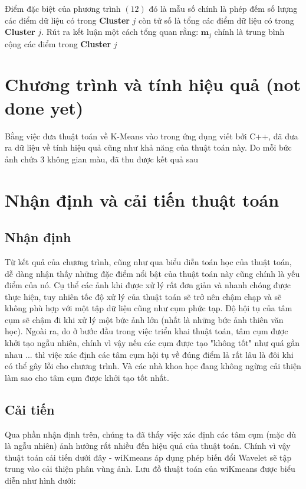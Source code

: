 \documentclass[12pt,a4paper]{article}
\begin{document}
Điểm đặc biệt của phương trình $(12)$ đó là mẫu số chính là phép đếm số lượng các điểm dữ liệu có trong \textbf{Cluster} $j$ còn tử số là tổng các điểm dữ liệu có trong \textbf{Cluster} $j$. Rút ra kết luận một cách tổng quan rằng: $\mathbf{m}_j$ chính là trung bình cộng các điểm trong \textbf{Cluster} $j$

\section{Chương trình và tính hiệu quả (not done yet)}
Bằng việc đưa thuật toán về K-Means vào trong ứng dụng viết bởi C++, đã đưa ra dữ liệu về tính hiệu quả cũng như khả năng của thuật toán này. Do mỗi bức ảnh chứa 3 không gian màu, đã thu được kết quả sau 

\section{Nhận định và cải tiến thuật toán}
\subsection{Nhận định}
Từ kết quả của chương trình, cũng như qua biểu diễn toán học của thuật toán, dễ dàng nhận thấy những đặc điểm nổi bật của thuật toán này cũng chính là yếu điểm của nó. Cụ thể các ảnh khi được xử lý rất đơn giản và nhanh chóng được thực hiện, tuy nhiên tốc độ xử lý của thuật toán sẽ trở nên chậm chạp và sẽ không phù hợp với một tập dữ liệu cũng như cụm phức tạp. Độ hội tụ của tâm cụm sẽ chậm đi khi xử lý một bức ảnh lớn (nhất là những bức ảnh thiên văn học). Ngoài ra, do ở bước đầu trong việc triển khai thuật toán, tâm cụm được khởi tạo ngẫu nhiên, chính vì vậy nếu các cụm được tạo "không tốt" như quá gần nhau ... thì việc xác định các tâm cụm hội tụ về đúng điểm lả rất lâu là đôi khi có thể gây lỗi cho chương trình. Và các nhà khoa học đang không ngừng cải thiện làm sao cho tâm cụm được khởi tạo tốt nhất.

\subsection{Cải tiến}
Qua phần nhận định trên, chúng ta đã thấy việc xác định các tâm cụm (mặc dù là ngẫu nhiên) ảnh hưởng rất nhiều đến hiệu quả của thuật toán. Chính vì vậy thuật toán cải tiến dưới đây - wiKmeans áp dụng phép biến đổi Wavelet sẽ tập trung vào cải thiện phân vùng ảnh. Lưu đồ thuật toán của wiKmeans được biểu diễn như hình dưới:
\end{document}
